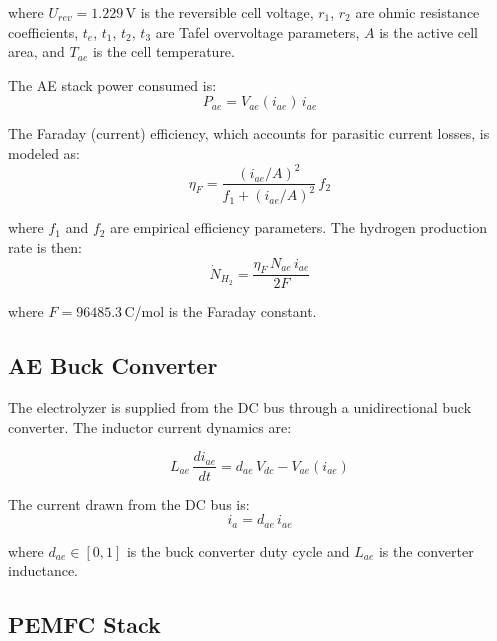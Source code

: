 \documentclass[journal]{IEEEtran}
\begin{document}
where $U_{rev} = 1.229$\,V is the reversible cell voltage, $r_1$, $r_2$
are ohmic resistance coefficients, $t_e$, $t_1$, $t_2$, $t_3$ are Tafel
overvoltage parameters, $A$ is the active cell area, and $T_{ae}$ is the
cell temperature.

The AE stack power consumed is:
\begin{equation}
P_{ae} = V_{ae}(i_{ae})\,i_{ae}
\label{eq:ae_power}
\end{equation}

The Faraday (current) efficiency, which accounts for parasitic current
losses, is modeled as:
\begin{equation}
\eta_F = \frac{(i_{ae}/A)^2}{f_1 + (i_{ae}/A)^2}\,f_2
\label{eq:ae_etaF}
\end{equation}

where $f_1$ and $f_2$ are empirical efficiency parameters. The hydrogen
production rate is then:
\begin{equation}
\dot{N}_{H_2} = \frac{\eta_F\,N_{ae}\,i_{ae}}{2F}
\label{eq:ae_nh2}
\end{equation}

where $F = 96485.3$\,C/mol is the Faraday constant.

\subsection{AE Buck Converter}
\label{subsec:ae_conv}

The electrolyzer is supplied from the DC bus through a unidirectional buck
converter. The inductor current dynamics are:

\begin{equation}
L_{ae}\,\frac{di_{ae}}{dt} = d_{ae}\,V_{dc} - V_{ae}(i_{ae})
\label{eq:ae_conv}
\end{equation}

The current drawn from the DC bus is:
\begin{equation}
i_a = d_{ae}\,i_{ae}
\label{eq:ae_ia}
\end{equation}

where $d_{ae} \in [0,1]$ is the buck converter duty cycle and $L_{ae}$ is
the converter inductance.

\subsection{PEMFC Stack}
\label{subsec:fc_stack}
\end{document}
